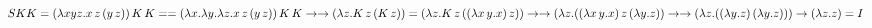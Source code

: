 \documentclass[fleqn]{article}
\begin{document}
\Large
$S K K = (\lambda x y z. x \, z \, (y \, z)) \, K \, K =
\\* = (\lambda x. \lambda y. \lambda z. x \, z \, (y \, z)) \, K \, K \to
\\* \to  (\lambda z. K \, z \, (K \, z)) = (\lambda z. K \, z \, ((\lambda x \, y.x) \, z)) \to
\\* \to (\lambda z. ((\lambda x \, y.x) \, z \, (\lambda y.z)) \to
\\* \to  (\lambda z. ((\lambda y.z) \, (\lambda y.z))) \to (\lambda z.z) = I$
\end{document}

